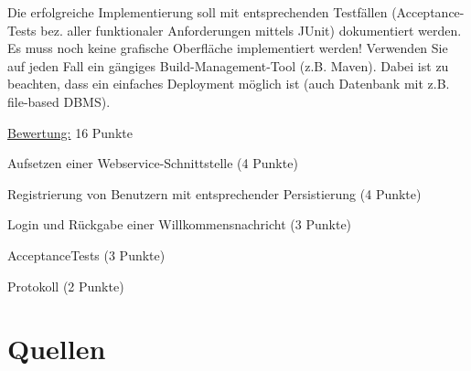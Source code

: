 Die erfolgreiche Implementierung soll mit entsprechenden Testfällen (Acceptance-Tests bez. aller funktionaler Anforderungen mittels JUnit) dokumentiert werden. Es muss noch keine grafische Oberfläche implementiert werden! Verwenden Sie auf jeden Fall ein gängiges Build-Management-Tool (z.B. Maven). Dabei ist zu beachten, dass ein einfaches Deployment möglich ist (auch Datenbank mit z.B. file-based DBMS).
\clearpage

\uline{Bewertung:} 16 Punkte
\begin{list}{-}
\item Aufsetzen einer Webservice-Schnittstelle (4 Punkte)
\item Registrierung von Benutzern mit entsprechender Persistierung (4 Punkte)
\item Login und Rückgabe einer Willkommensnachricht (3 Punkte)
\item AcceptanceTests (3 Punkte)
\item Protokoll (2 Punkte)
\end{list}

\section{Quellen}
\cite{RESTIntro} \cite{REST-JAX-RS} \cite{JavaEE} \cite{Heroku} 

\clearpage

